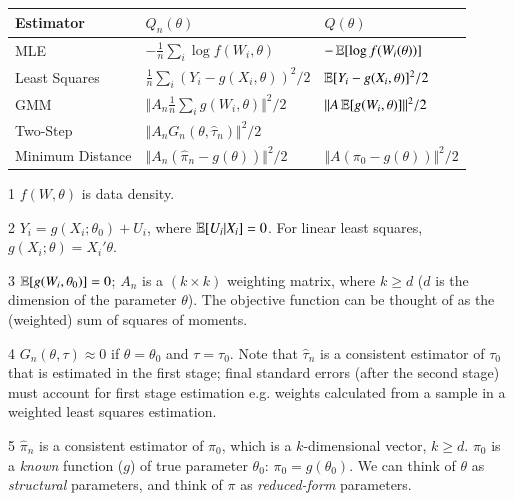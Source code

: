 \documentclass[../main.tex]{subfiles}
\begin{document}
    \begin{table}[!ht]
     \centering
     \renewcommand{\arraystretch}{1.5}
     \begin{threeparttable}
       \small
       \begin{tabular}{R{4cm}|P{3.5cm}P{3.5cm}} 
        \textbf{Estimator}  & $Q_n(\theta)$ & $Q(\theta)$ \\ \hline \hline
        MLE                & $-\frac{1}{n} \sum_i \log f(W_i, \theta)$ & $-\operatorname{\mathbb{E}}[\log f(W_i(\theta))]$ \\
        Least Squares      & $\frac{1}{n} \sum_i (Y_i - g(X_i, \theta))^2/2$ & $\operatorname{\mathbb{E}}[Y_i - g(X_i, \theta)]^2/2$ \\
        GMM                & $\Vert A_n \frac{1}{n} \sum_i g(W_i, \theta) \Vert^2 /2$  & $\Vert A\operatorname{\mathbb{E}}[g(W_i, \theta)]\Vert^2 /2$ \\
        Two-Step           & $\Vert A_n G_n (\theta, \hat{\tau}_n)\Vert^2 /2$    &  \\
        Minimum Distance   & $\Vert A_n (\hat{\pi}_n - g(\theta))\Vert ^2/2$   & $\Vert A(\pi_0 - g(\theta)) \Vert^2/2$ \\ \bottomrule
        \end{tabular}
       \begin{tablenotes}
         \footnotesize
         \item[1] $f(W, \theta)$ is data density.
         \item[2] $Y_i = g(X_i; \theta_0) + U_i$, where $\operatorname{\mathbb{E}}[U_i|X_i] = 0$. For linear least squares, $g(X_i;\theta) = X_i'\theta$.
         \item[3] $\operatorname{\mathbb{E}}[g(W_i, \theta_0)] = 0$; $A_n$ is a $(k \times k)$ weighting matrix, where $k \geq d$ ($d$ is the dimension of the parameter $\theta$). The objective function can be thought of as the (weighted) sum of squares of moments.
         \item[4] $G_n(\theta, \tau) \approx 0$ if $\theta = \theta_0$ and $\tau = \tau_0$. Note that $\hat{\tau}_n$ is a consistent estimator of $\tau_0$ that is estimated in the first stage; final standard errors (after the second stage) must account for first stage estimation e.g. weights calculated from a sample in a weighted least squares estimation.
         \item[5] $\hat{\pi}_n$ is a consistent estimator of $\pi_0$, which is a $k$-dimensional vector, $k \geq d$. $\pi_0$ is a \emph{known} function ($g$) of true parameter $\theta_0$: $\pi_0 = g(\theta_0)$. We can think of $\theta$ as \emph{structural} parameters, and think of $\pi$ as \emph{reduced-form} parameters.
       \end{tablenotes}
     \end{threeparttable}
   \end{table}
\end{document}
